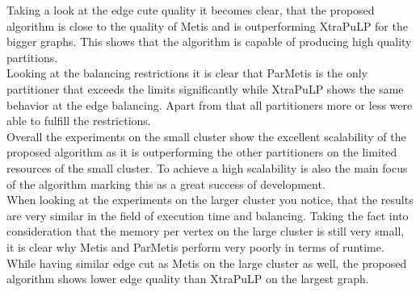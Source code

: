 \documentclass[acmsmall,nonacm,screen,review]{acmart}
\begin{document}
Taking a look at the edge cute quality it becomes clear, that the proposed algorithm is close to the quality of Metis and is outperforming XtraPuLP for the bigger graphs. This shows that the algorithm is capable of producing high quality partitions.\\
Looking at the balancing restrictions it is clear that ParMetis is the only partitioner that exceeds the limits significantly while XtraPuLP shows the same behavior at the edge balancing. Apart from that all partitioners more or less were able to fulfill the restrictions.\\
Overall the experiments on the small cluster show the excellent scalability of the proposed algorithm as it is outperforming the other partitioners on the limited resources of the small cluster. To achieve a high scalability is also the main focus of the algorithm marking this as a great success of development.\\
When looking at the experiments on the larger cluster you notice, that the results are very similar in the field of execution time and balancing. Taking the fact into consideration that the memory per vertex on the large cluster is still very small, it is clear why Metis and ParMetis perform very poorly in terms of runtime. While having similar edge cut as Metis on the large cluster as well, the proposed algorithm shows lower edge quality than XtraPuLP on the largest graph. 
\end{document}

